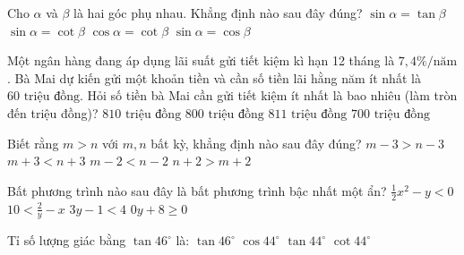 \documentclass[12pt,a4paper]{article}
\begin{document}
\begin{ex}
Cho $\alpha$ và $\beta$ là hai góc phụ nhau. Khẳng định nào sau đây đúng?
\choice
{$\sin \alpha = \tan \beta$}
{$\sin \alpha = \cot \beta$}
{$\cos \alpha = \cot \beta$}
{\True $\sin \alpha = \cos \beta$}
\end{ex}

\begin{ex}
Một ngân hàng đang áp dụng lãi suất gửi tiết kiệm kì hạn 12 tháng là $7{,}4\%/\text{năm}$. Bà Mai dự kiến gửi một khoản tiền và cần số tiền lãi hằng năm ít nhất là $60\text{ triệu đồng}$. Hỏi số tiền bà Mai cần gửi tiết kiệm ít nhất là bao nhiêu (làm tròn đến triệu đồng)?
\choice
{$810\text{ triệu đồng}$}
{$800\text{ triệu đồng}$}
{\True $811\text{ triệu đồng}$}
{$700\text{ triệu đồng}$}
\end{ex}

\begin{ex}
Biết rằng $m > n$ với $m, n$ bất kỳ, khẳng định nào sau đây đúng?
\choice
{\True $m - 3 > n - 3$}
{$m + 3 < n + 3$}
{$m - 2 < n - 2$}
{$n + 2 > m + 2$}
\end{ex}

\begin{ex}
Bất phương trình nào sau đây là bất phương trình bậc nhất một ẩn?
\choice
{$\frac{1}{2}x^2 - y < 0$}
{$10 < \frac{2}{y} - x$}
{\True $3y - 1 < 4$}
{$0y + 8 \ge 0$}
\end{ex}

\begin{ex}
Tỉ số lượng giác bằng $\tan 46^\circ$ là:
\choice
{$\tan 46^\circ$}
{$\cos 44^\circ$}
{$\tan 44^\circ$}
{\True $\cot 44^\circ$}
\end{ex}
\end{document}
